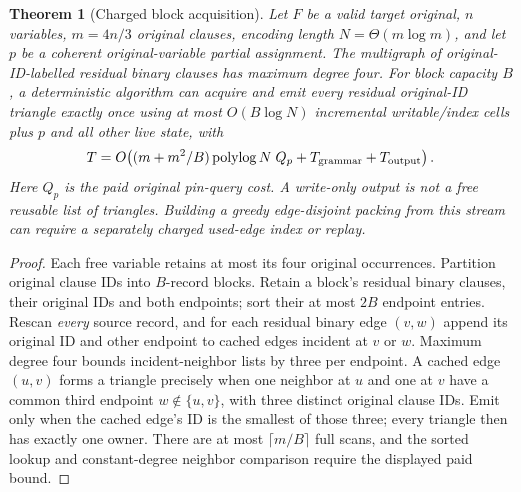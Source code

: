 \documentclass[11pt]{article}
\newtheorem{theorem}{Theorem}
\begin{document}
\begin{theorem}[Charged block acquisition]
Let $F$ be a valid target original, $n$ variables, $m=4n/3$ original clauses, encoding length $N=\Theta(m\log m)$, and let $p$ be a coherent original-variable partial assignment. The multigraph of original-ID-labelled residual binary clauses has maximum degree four. For block capacity $B$, a deterministic algorithm can acquire and emit \emph{every} residual original-ID triangle exactly once using at most $O(B\log N)$ incremental writable/index cells plus $p$ and all other live state, with
\[
T=O\!\left((m+m^2/B)\operatorname{polylog}N\;Q_p+T_{\rm grammar}+T_{\rm output}\right).
\]
Here $Q_p$ is the \emph{paid} original pin-query cost. A write-only output is not a free reusable list of triangles. Building a greedy edge-disjoint packing from this stream can require a separately charged used-edge index or replay.
\end{theorem}
\begin{proof}
Each free variable retains at most its four original occurrences. Partition original clause IDs into $B$-record blocks. Retain a block's residual binary clauses, their original IDs and both endpoints; sort their at most $2B$ endpoint entries. Rescan \emph{every} source record, and for each residual binary edge $(v,w)$ append its original ID and other endpoint to cached edges incident at $v$ or $w$. Maximum degree four bounds incident-neighbor lists by three per endpoint. A cached edge $(u,v)$ forms a triangle precisely when one neighbor at $u$ and one at $v$ have a common third endpoint $w\notin\{u,v\}$, with three distinct original clause IDs. Emit only when the cached edge's ID is the smallest of those three; every triangle then has exactly one owner. There are at most $\lceil m/B\rceil$ full scans, and the sorted lookup and constant-degree neighbor comparison require the displayed paid bound. \end{proof}
\end{document}
